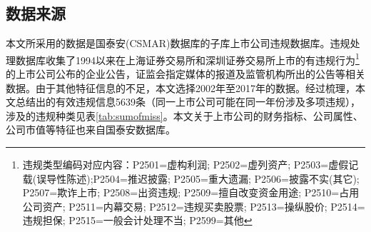 \documentclass{article}
\begin{document}
\subsection{数据来源}
\par 本文所采用的数据是国泰安(CSMAR)数据库的子库上市公司违规数据库。违规处理数据库收集了1994以来在上海证券交易所和深圳证券交易所上市的有违规行为\footnote{违规类型编码对应内容：P2501=虚构利润; P2502=虚列资产; P2503=虚假记载(误导性陈述);P2504=推迟披露; P2505=重大遗漏; P2506=披露不实(其它); P2507=欺诈上市; P2508=出资违规; P2509=擅自改变资金用途; P2510=占用公司资产; P2511=内幕交易;  P2512=违规买卖股票; P2513=操纵股价; P2514=违规担保; P2515=一般会计处理不当; P2599=其他}的上市公司公布的企业公告，证监会指定媒体的报道及监管机构所出的公告等相关数据。由于其他特征信息的不足，本文选择2002年至2017年的数据。经过梳理，本文总结出的有效违规信息5639条（同一上市公司可能在同一年份涉及多项违规），涉及的违规种类见表\ref{tab:sumofmiss}。本文关于上市公司的财务指标、公司属性、公司市值等特征也来自国泰安数据库。
\end{document}
